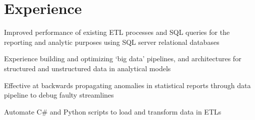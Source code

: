 \documentclass[letterpaper]{deedy-resume} %
\begin{document}
\begin{minipage}[t]{0.66\textwidth} %

\sectionspace
\section{Experience}

\vspace{11pt}

\begin{tightitemize}
\item Improved performance of existing ETL processes and SQL queries for the reporting and analytic purposes using SQL server relational databases

\item Experience building and optimizing ‘big data’  pipelines, and architectures  for structured and unstructured data in analytical models 
\item Effective at backwards propagating anomalies in statistical reports through data pipeline to debug faulty streamlines

\item Automate C\# and Python scripts to load and transform data in ETLs 







\end{tightitemize}
\end{minipage}
\end{document}
